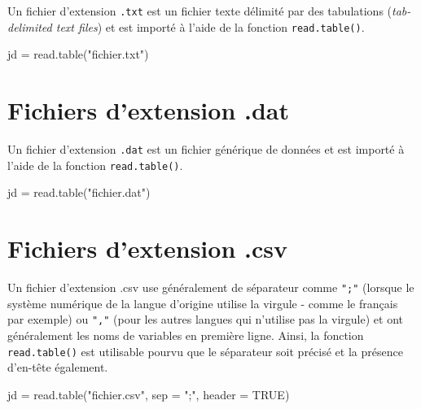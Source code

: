 \documentclass[
]{book}
\newenvironment{Shaded}{}{}
\newcommand{\AttributeTok}[1]{#1}
\newcommand{\ConstantTok}[1]{#1}
\newcommand{\FunctionTok}[1]{#1}
\newcommand{\NormalTok}[1]{#1}
\newcommand{\OtherTok}[1]{#1}
\newcommand{\StringTok}[1]{#1}
\begin{document}
Un fichier d'extension \texttt{.txt} est un fichier texte délimité par des tabulations (\emph{tab-delimited text files}) et est importé à l'aide de la fonction \texttt{read.table()}.

\begin{Shaded}
\begin{Highlighting}[]
\NormalTok{jd }\OtherTok{=} \FunctionTok{read.table}\NormalTok{(}\StringTok{"fichier.txt"}\NormalTok{)}
\end{Highlighting}
\end{Shaded}

\hypertarget{fichiers-dextension-.dat}{%
\section{Fichiers d'extension .dat}\label{fichiers-dextension-.dat}}

Un fichier d'extension \texttt{.dat} est un fichier générique de données et est importé à l'aide de la fonction \texttt{read.table()}.

\begin{Shaded}
\begin{Highlighting}[]
\NormalTok{jd }\OtherTok{=} \FunctionTok{read.table}\NormalTok{(}\StringTok{"fichier.dat"}\NormalTok{)}
\end{Highlighting}
\end{Shaded}

\hypertarget{fichiers-dextension-.csv}{%
\section{Fichiers d'extension .csv}\label{fichiers-dextension-.csv}}

Un fichier d'extension .csv use généralement de séparateur comme \texttt{";"} (lorsque le système numérique de la langue d'origine utilise la virgule - comme le français par exemple) ou \texttt{","} (pour les autres langues qui n'utilise pas la virgule) et ont généralement les noms de variables en première ligne. Ainsi, la fonction \texttt{read.table()} est utilisable pourvu que le séparateur soit précisé et la présence d'en-tête également.

\begin{Shaded}
\begin{Highlighting}[]
\NormalTok{jd }\OtherTok{=} \FunctionTok{read.table}\NormalTok{(}\StringTok{"fichier.csv"}\NormalTok{, }\AttributeTok{sep =} \StringTok{";"}\NormalTok{, }\AttributeTok{header =} \ConstantTok{TRUE}\NormalTok{)}
\end{Highlighting}
\end{Shaded}
\end{document}
